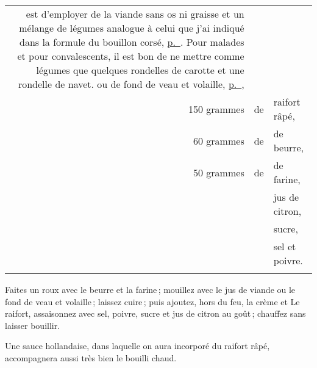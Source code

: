 \begin{longtable}{rlp{16em}}
{                                                    est d'employer de la viande sans os ni graisse 
                                                    et un mélange de légumes analogue à celui que 
                                                    j'ai indiqué dans la formule du 
                                                    bouillon corsé, \hyperlink{p0202}{p. \pageref{pg0202}}. 
                                                    Pour malades et pour convalescents, il 
                                                    est bon de ne mettre comme légumes que quelques 
                                                    rondelles de carotte et une rondelle de navet.}
                                                    ou de fond de veau et volaille, 
                                                    \hyperlink{p0418}{p. \pageref{pg0418}},               \\
  150 grammes                   & de              & raifort râpé,                                         \\
  60  grammes                   & de              & de beurre,                                            \\
  50  grammes                   & de              & de farine,                                            \\
                                &                 & jus de citron,                                        \\
                                &                 & sucre,                                                \\
                                &                 & sel et poivre.                                        \\
                                &                 &                                                       \\
\end{longtable}
\normalsize

Faites un roux avec le beurre et la farine ; mouillez avec le jus de viande ou
le fond de veau et volaille ; laissez cuire ; puis ajoutez, hors du feu, la
crème et Le raifort, assaisonnez avec sel, poivre, sucre et jus de citron au
goût ; chauffez sans laisser bouillir.

\smallskip

Une sauce hollandaise, dans laquelle on aura incorporé du raifort râpé,
accompagnera aussi très bien le bouilli chaud.

\smallskip

